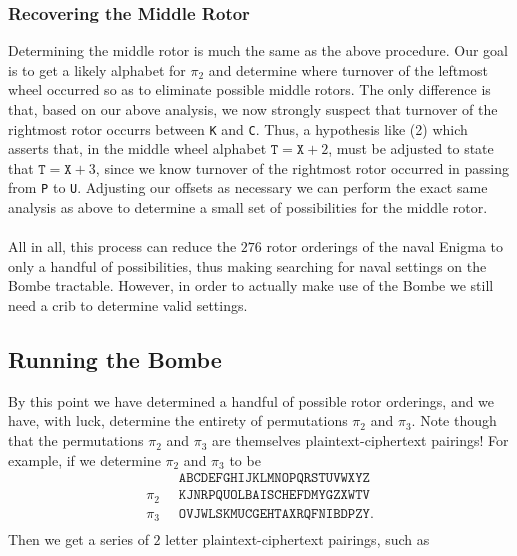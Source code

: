 \subsubsection{Recovering the Middle Rotor}
Determining the middle rotor is much the same as the above
procedure. Our goal is to get a likely alphabet for $\pi_2$ and
determine where turnover of the leftmost wheel occurred so as to
eliminate possible middle rotors. The only difference is that, based
on our above analysis, we
now strongly suspect that turnover of the rightmost rotor occurrs
between \texttt{K} and \texttt{C}. Thus, a hypothesis like (2) which
asserts that, in the middle wheel alphabet $\texttt{T} = \texttt{X}
+ 2$, must be adjusted to state that $\texttt{T} = \texttt{X} + 3$,
since we know turnover of the rightmost rotor occurred in passing
from \texttt{P} to \texttt{U}. Adjusting our offsets as necessary
we can perform the exact same analysis as above to determine a
small set of possibilities for the middle rotor.
\\\\All in all, this process can reduce the $276$ rotor orderings
of the naval Enigma to only a handful of possibilities, thus making
searching for naval settings on the Bombe tractable. However, in
order to actually make use of the Bombe we still need a crib to
determine valid settings.

\subsection{Running the Bombe}
By this point we have determined a handful of possible rotor
orderings, and we have, with luck, determine the entirety of
permutations $\pi_2$ and $\pi_3$. Note though that the
permutations $\pi_2$ and $\pi_3$ are themselves
plaintext-ciphertext pairings! For example, if we determine
$\pi_2$ and $\pi_3$ to be
\begin{align*}
  & \texttt{ABCDEFGHIJKLMNOPQRSTUVWXYZ} \\
  \pi_2\;\; & \texttt{KJNRPQUOLBAISCHEFDMYGZXWTV} \\
  \pi_3\;\; & \texttt{OVJWLSKMUCGEHTAXRQFNIBDPZY}. \\
\end{align*}
Then we get a series of $2$ letter plaintext-ciphertext pairings, such as

